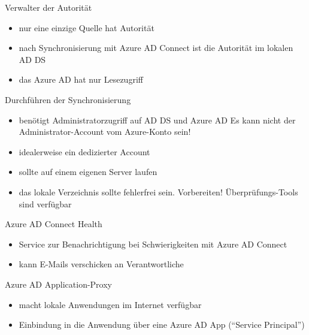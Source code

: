 \begin{flashcard}[Definition]{Verwalter der Autorität}
  \begin{itemize}
    \item nur eine einzige Quelle hat Autorität
    \item nach Synchronisierung mit Azure AD Connect ist die Autorität im lokalen AD DS
    \item das Azure AD hat nur Lesezugriff
  \end{itemize}
\end{flashcard}

\begin{flashcard}[Definition]{Durchführen der Synchronisierung}
  \begin{itemize}
    \item benötigt Administratorzugriff auf AD DS und Azure AD\newline
      Es kann nicht der Administrator-Account vom Azure-Konto sein!
    \item idealerweise ein dedizierter Account
    \item sollte auf einem eigenen Server laufen
    \item das lokale Verzeichnis sollte fehlerfrei sein. Vorbereiten!\newline
      Überprüfungs-Tools sind verfügbar
  \end{itemize}
\end{flashcard}

\begin{flashcard}[Definition]{Azure AD Connect Health}
  \begin{itemize}
    \item Service zur Benachrichtigung bei Schwierigkeiten mit Azure AD Connect
    \item kann E-Mails verschicken an Verantwortliche
  \end{itemize}
\end{flashcard}

\begin{flashcard}[Definition]{Azure AD Application-Proxy}
  \begin{itemize}
    \item macht lokale Anwendungen im Internet verfügbar
    \item Einbindung in die Anwendung über eine Azure AD App (``Service Principal'')
  \end{itemize}
\end{flashcard}


